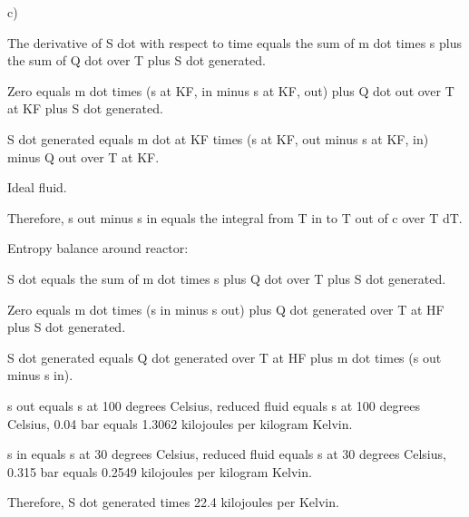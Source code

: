 c)

The derivative of S dot with respect to time equals the sum of m dot times s plus the sum of Q dot over T plus S dot generated.

Zero equals m dot times (s at KF, in minus s at KF, out) plus Q dot out over T at KF plus S dot generated.

S dot generated equals m dot at KF times (s at KF, out minus s at KF, in) minus Q out over T at KF.

Ideal fluid.

Therefore, s out minus s in equals the integral from T in to T out of c over T dT.

Entropy balance around reactor:

S dot equals the sum of m dot times s plus Q dot over T plus S dot generated.

Zero equals m dot times (s in minus s out) plus Q dot generated over T at HF plus S dot generated.

S dot generated equals Q dot generated over T at HF plus m dot times (s out minus s in).

s out equals s at 100 degrees Celsius, reduced fluid equals s at 100 degrees Celsius, 0.04 bar equals 1.3062 kilojoules per kilogram Kelvin.

s in equals s at 30 degrees Celsius, reduced fluid equals s at 30 degrees Celsius, 0.315 bar equals 0.2549 kilojoules per kilogram Kelvin.

Therefore, S dot generated times 22.4 kilojoules per Kelvin.